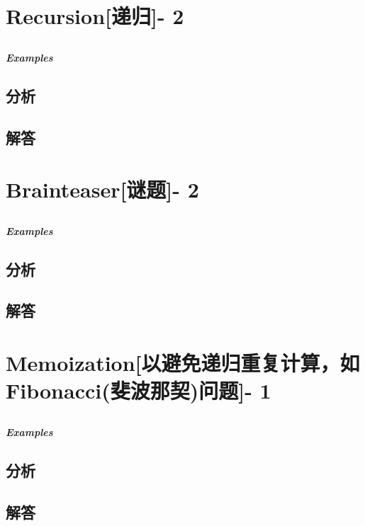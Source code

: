 \documentclass[UTF8,a4paper,12pt]{ctexbook}
\begin{document}
\section{Recursion[递归]- 2}	
	\subsection{}
	
	\subparagraph{Examples}
	
	\subsection{分析}
	
	\subsection{解答}
\section{Brainteaser[谜题]- 2}
	\subsection{}
	
	\subparagraph{Examples}
	
	\subsection{分析}
	
	\subsection{解答}
\section{Memoization[以避免递归重复计算，如Fibonacci(斐波那契)问题]- 1}
	\subsection{}
	
	\subparagraph{Examples}
	
	\subsection{分析}
	
	\subsection{解答}
\end{document}
